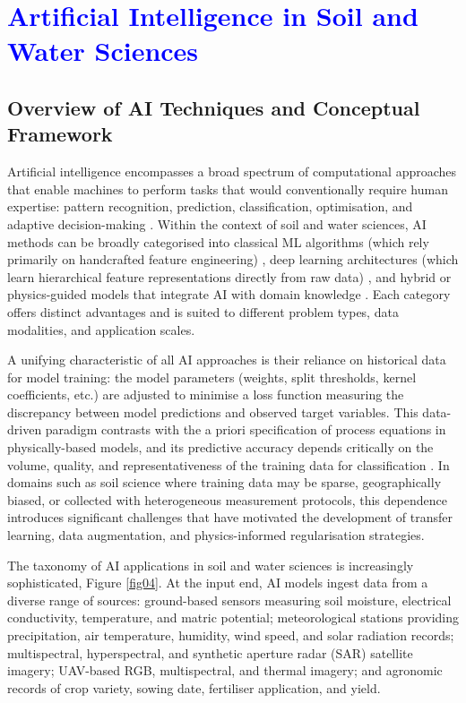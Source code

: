 \documentclass[land,article,submit,pdftex,moreauthors]{Definitions/mdpi}
\numberwithin{equation}{section}
\begin{document}

\section{\textcolor{blue}{Artificial Intelligence in Soil and Water Sciences}}

\subsection{Overview of AI Techniques and Conceptual Framework}

Artificial intelligence encompasses a broad spectrum of computational approaches that enable machines to perform tasks that would conventionally require human expertise: pattern recognition, prediction, classification, optimisation, and adaptive decision-making \cite{Fan2018}. Within the context of soil and water sciences, AI methods can be broadly categorised into classical ML algorithms (which rely primarily on handcrafted feature engineering) \cite{Amani}, deep learning architectures (which learn hierarchical feature representations directly from raw data) \cite{Attri}, and hybrid or physics-guided models that integrate AI with domain knowledge \citep{jordan2015machine}. Each category offers distinct advantages and is suited to different problem types, data modalities, and application scales.

A unifying characteristic of all AI approaches is their reliance on historical data for model training: the model parameters (weights, split thresholds, kernel coefficients, etc.) are adjusted to minimise a loss function measuring the discrepancy between model predictions and observed target variables. This data-driven paradigm contrasts with the a priori specification of process equations in physically-based models, and its predictive accuracy depends critically on the volume, quality, and representativeness of the training data for classification \cite{Tso2007}. In domains such as soil science where training data may be sparse, geographically biased, or collected with heterogeneous measurement protocols, this dependence introduces significant challenges that have motivated the development of transfer learning, data augmentation, and physics-informed regularisation strategies.

The taxonomy of AI applications in soil and water sciences is increasingly sophisticated, Figure \ref{fig04}. At the input end, AI models ingest data from a diverse range of sources: ground-based sensors measuring soil moisture, electrical conductivity, temperature, and matric potential; meteorological stations providing precipitation, air temperature, humidity, wind speed, and solar radiation records; multispectral, hyperspectral, and synthetic aperture radar (SAR) satellite imagery; UAV-based RGB, multispectral, and thermal imagery; and agronomic records of crop variety, sowing date, fertiliser application, and yield. 
\end{document}

